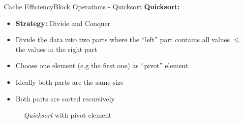 \begin{frame}{Cache Efficiency}{Block Operations - Quicksort}
  \textbf{Quicksort:}\\
  \begin{itemize}
    \item<2->
      \textbf{Strategy:} Divide and Conquer
    \item<3->
      Divide the data into two parts where the \enquote{left} part contains
      all values {\color{MainA}$\leq$} the values in the right part
    \item<4->
      Choose one element (e.g the first one) as
      {\color{MainA}\enquote{pivot} element}
    \item<5->
      Ideally both parts are the same size
    \item<6->
      Both parts are sorted recursively
  \end{itemize}
  \vspace{-1em}
  \begin{figure}%
    \begin{adjustbox}{width=\linewidth}%
    \end{adjustbox}%
    \caption{\textit{Quicksort} with pivot element}
    \label{fig:caching:quicksort_pivot}
  \end{figure}%
\end{frame}


